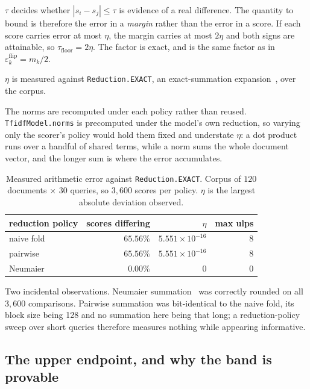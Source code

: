 \documentclass[11pt,a4paper]{article}
\theoremstyle{plain} \newtheorem{proposition}{Proposition} \theoremstyle{remark}
\newcommand{\code}[1]{\texttt{\small #1}}
\begin{document}
$\tau$ decides whether $|s_i - s_j| \le \tau$ is evidence of a real difference.
The quantity to bound is therefore the error in a \emph{margin} rather than the
error in a score. If each score carries error at most $\eta$, the margin carries
at most $2\eta$ and both signs are attainable, so $\tau_{\text{floor}} = 2\eta$.
The factor is exact, and is the same factor as in $\varepsilon_k^{\text{flip}} =
m_k/2$.

$\eta$ is measured against \code{Reduction.EXACT}, an exact-summation
expansion~\cite{shewchuk1997adaptive}, over the corpus.

The norms are recomputed under each policy rather than reused.
\code{TfidfModel.norms} is precomputed under the model's own reduction, so
varying only the scorer's policy would hold them fixed and understate $\eta$: a
dot product runs over a handful of shared terms, while a norm sums the whole
document vector, and the longer sum is where the error accumulates.

\begin{table}[ht]\centering
\caption{Measured arithmetic error against \code{Reduction.EXACT}. Corpus of
$120$ documents $\times$ $30$ queries, so $3{,}600$ scores per policy. $\eta$ is
the largest absolute deviation observed.}
\label{tab:noise}
\begin{tabular}{lrrr}
\toprule
reduction policy & scores differing & $\eta$                & max ulps \\
\midrule
naive fold       & $65.56\%$        & $5.551\times10^{-16}$ & $8$ \\
pairwise         & $65.56\%$        & $5.551\times10^{-16}$ & $8$ \\
Neumaier         & $0.00\%$         & $0$                   & $0$ \\
\bottomrule
\end{tabular}
\end{table}

Two incidental observations. Neumaier
summation~\cite{neumaier1974rundungsfehler} was correctly rounded on all
$3{,}600$ comparisons. Pairwise summation was bit-identical to the naive fold,
its block size being 128 and no summation here being that long; a
reduction-policy sweep over short queries therefore measures nothing while
appearing informative.

\subsection{The upper endpoint, and why the band is provable}
\end{document}
